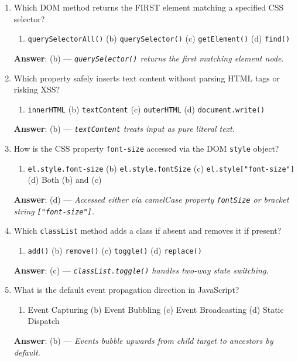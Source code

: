 \begin{enumerate}[leftmargin=1.5em]
    \item Which DOM method returns the FIRST element matching a specified CSS selector?
    \begin{enumerate}[label=(\alph*)]
        \item \texttt{querySelectorAll()} \quad (b) \texttt{querySelector()} \quad (c) \texttt{getElement()} \quad (d) \texttt{find()}
    \end{enumerate}
    \textbf{Answer}: (b) --- \textit{\texttt{querySelector()} returns the first matching element node.}

    \item Which property safely inserts text content without parsing HTML tags or risking XSS?
    \begin{enumerate}[label=(\alph*)]
        \item \texttt{innerHTML} \quad (b) \texttt{textContent} \quad (c) \texttt{outerHTML} \quad (d) \texttt{document.write()}
    \end{enumerate}
    \textbf{Answer}: (b) --- \textit{\texttt{textContent} treats input as pure literal text.}

    \item How is the CSS property \texttt{font-size} accessed via the DOM \texttt{style} object?
    \begin{enumerate}[label=(\alph*)]
        \item \texttt{el.style.font-size} \quad (b) \texttt{el.style.fontSize} \quad (c) \texttt{el.style["font-size"]} \quad (d) Both (b) and (c)
    \end{enumerate}
    \textbf{Answer}: (d) --- \textit{Accessed either via camelCase property \texttt{fontSize} or bracket string \texttt{["font-size"]}.}

    \item Which \texttt{classList} method adds a class if absent and removes it if present?
    \begin{enumerate}[label=(\alph*)]
        \item \texttt{add()} \quad (b) \texttt{remove()} \quad (c) \texttt{toggle()} \quad (d) \texttt{replace()}
    \end{enumerate}
    \textbf{Answer}: (c) --- \textit{\texttt{classList.toggle()} handles two-way state switching.}

    \item What is the default event propagation direction in JavaScript?
    \begin{enumerate}[label=(\alph*)]
        \item Event Capturing \quad (b) Event Bubbling \quad (c) Event Broadcasting \quad (d) Static Dispatch
    \end{enumerate}
    \textbf{Answer}: (b) --- \textit{Events bubble upwards from child target to ancestors by default.}


\end{enumerate}

